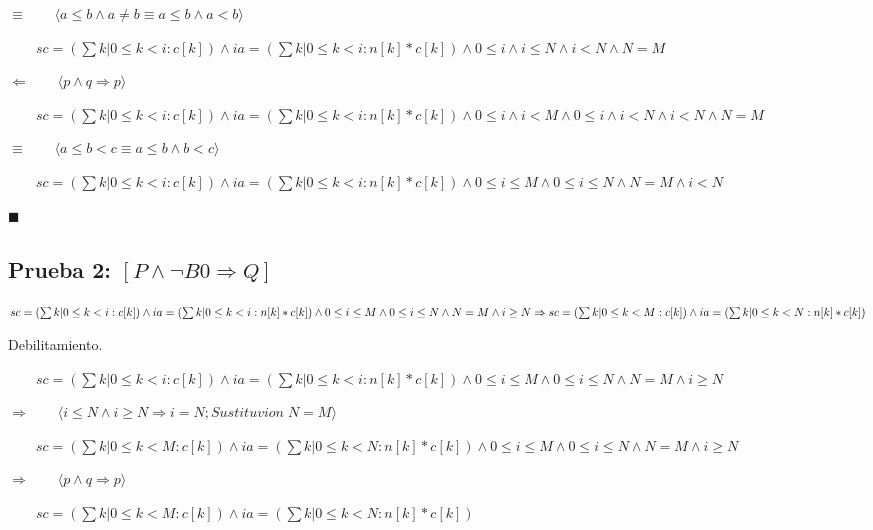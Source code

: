 \documentclass[hidelinks]{article}
\begin{document}
$\equiv  \qquad \langle a \leq b \land a \neq b \equiv a \leq b \land a < b \rangle$ \par
$\qquad sc=(\sum k|0 \leq k < i: c[k]) \land ia=(\sum k|0 \leq k < i: n[k]*c[k]) \land 0 \leq i \land i \leq N \land i < N  \land N=M$ \par
$\Leftarrow  \qquad \langle p \land q \Rightarrow p \rangle$ \par
$\qquad sc=(\sum k|0 \leq k < i: c[k]) \land ia=(\sum k|0 \leq k < i: n[k]*c[k]) \land 0 \leq i \land i < M \land 0 \leq i \land i < N \land i < N  \land N=M$ \par
$\equiv  \qquad \langle a \leq b <c \equiv a \leq b \land b < c \rangle$ \par
$\qquad sc=(\sum k|0 \leq k < i: c[k]) \land ia=(\sum k|0 \leq k < i: n[k]*c[k]) \land 0 \leq i \leq M \land 0 \leq i \leq N \land N=M \land i < N$ \par

$\blacksquare$\par

\newpage

\subsection*{Prueba 2: $[P \land \neg B0 \Rightarrow Q]$}

$sc=(\sum k|0 \leq k < i: c[k]) \land ia=(\sum k|0 \leq k < i: n[k]*c[k]) \land 0 \leq i \leq M \land 0 \leq i \leq N \land N=M \land i \geq N \Rightarrow \\
    sc=(\sum k|0 \leq k < M: c[k]) \land ia=(\sum k|0 \leq k < N: n[k]*c[k]) $ \par

Debilitamiento. \par
$\qquad sc=(\sum k|0 \leq k < i: c[k]) \land ia=(\sum k|0 \leq k < i: n[k]*c[k]) \land 0 \leq i \leq M \land 0 \leq i \leq N \land N=M \land i \geq N$\par
$\Rightarrow  \qquad \langle i \leq N \land i \geq N \Rightarrow i = N; Sustituvion \; N=M \rangle$ \par
$\qquad sc=(\sum k|0 \leq k < M: c[k]) \land ia=(\sum k|0 \leq k < N: n[k]*c[k]) \land 0 \leq i \leq M \land 0 \leq i \leq N \land N=M \land i \geq N$\par
$\Rightarrow  \qquad \langle p \land q \Rightarrow p \rangle$ \par
$\qquad sc=(\sum k|0 \leq k < M: c[k]) \land ia=(\sum k|0 \leq k < N: n[k]*c[k])$\par
\end{document}
